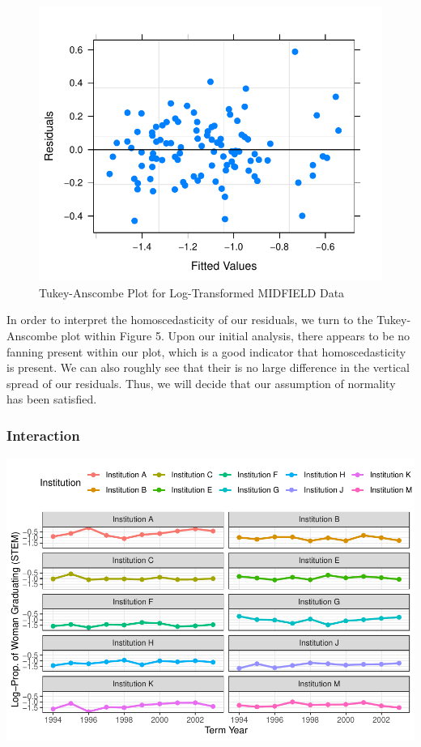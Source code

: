 \documentclass[]{article}
\begin{document}
\begin{figure}
\centering
\includegraphics{Stat_461_Final_Project_Report_files/figure-latex/logHomoscedasticity-1.pdf}
\caption{Tukey-Anscombe Plot for Log-Transformed MIDFIELD Data}
\end{figure}

In order to interpret the homoscedasticity of our residuals, we turn to
the Tukey-Anscombe plot within Figure 5. Upon our initial analysis,
there appears to be no fanning present within our plot, which is a good
indicator that homoscedasticity is present. We can also roughly see that
their is no large difference in the vertical spread of our residuals.
Thus, we will decide that our assumption of normality has been
satisfied.

\subsubsection{Interaction}\label{interaction}

\includegraphics{Stat_461_Final_Project_Report_files/figure-latex/logInteraction-1.pdf}
\end{document}
